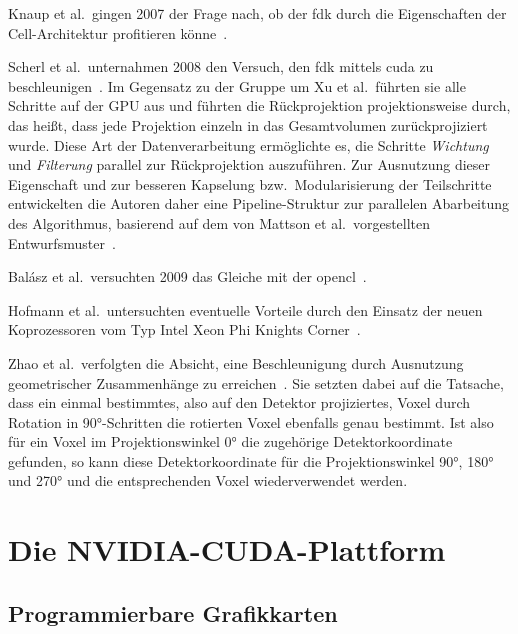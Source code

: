 Knaup et al.\ gingen 2007 der Frage nach, ob der \gls{fdk} durch die Eigenschaften der Cell-Architektur profitieren
könne~\cite{knaupsteck}.

Scherl et al.\ unternahmen 2008 den Versuch, den \gls{fdk} mittels \gls{cuda} zu beschleunigen~\cite{scherlkeck}. Im
Gegensatz zu der Gruppe um Xu et al.\ führten sie alle Schritte auf der GPU aus und führten die Rückprojektion
projektionsweise durch, das heißt, dass jede Projektion einzeln in das Gesamtvolumen zurückprojiziert wurde. Diese Art
der Datenverarbeitung ermöglichte es, die Schritte \textit{Wichtung} und \textit{Filterung} parallel zur Rückprojektion
auszuführen. Zur Ausnutzung dieser Eigenschaft und zur besseren Kapselung bzw.\ Modularisierung der Teilschritte
entwickelten die Autoren daher eine Pipeline-Struktur zur parallelen Abarbeitung des Algorithmus, basierend auf dem von
Mattson et al.\ vorgestellten Entwurfsmuster~\cite{mattsan}.

Balász et al.\ versuchten 2009 das Gleiche mit der \gls{opencl}~\cite{balgab}.

Hofmann et al.\ untersuchten eventuelle Vorteile durch den Einsatz der neuen Koprozessoren vom Typ 
Intel{\textregistered} Xeon Phi{\texttrademark} {\glq}Knights Corner{\grq}~\cite{hoftrei}.

Zhao et al.\ verfolgten die Absicht, eine Beschleunigung durch Ausnutzung geometrischer Zusammenhänge zu
erreichen~\cite{zhao}. Sie setzten dabei auf die Tatsache, dass ein einmal bestimmtes, also auf den Detektor
projiziertes, Voxel durch Rotation in 90°-Schritten die rotierten Voxel ebenfalls genau bestimmt. Ist also für ein
Voxel im Projektionswinkel 0° die zugehörige Detektorkoordinate gefunden, so kann diese Detektorkoordinate
für die Projektionswinkel 90°, 180° und 270° und die entsprechenden Voxel wiederverwendet werden.

\section{Die NVIDIA{\textregistered}-CUDA{\textregistered}-Plattform}

\subsection{Programmierbare Grafikkarten}

